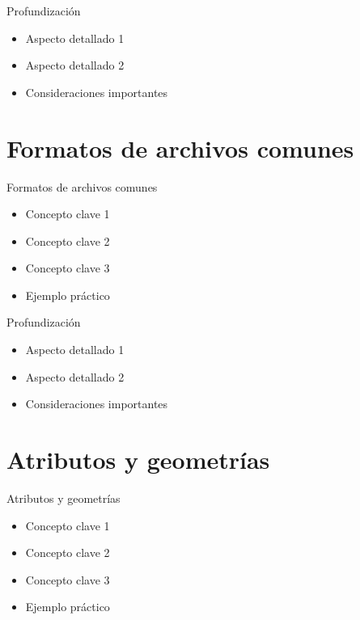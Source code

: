 \documentclass[10pt]{beamer}
\begin{document}
\begin{frame}{Profundización}
    \begin{itemize}
        \item Aspecto detallado 1
        \item Aspecto detallado 2
        \item Consideraciones importantes
    \end{itemize}
\end{frame}

\section{Formatos de archivos comunes}

\begin{frame}{Formatos de archivos comunes}
    \begin{itemize}
        \item Concepto clave 1
        \item Concepto clave 2
        \item Concepto clave 3
        \item Ejemplo práctico
    \end{itemize}
\end{frame}

\begin{frame}{Profundización}
    \begin{itemize}
        \item Aspecto detallado 1
        \item Aspecto detallado 2
        \item Consideraciones importantes
    \end{itemize}
\end{frame}

\section{Atributos y geometrías}

\begin{frame}{Atributos y geometrías}
    \begin{itemize}
        \item Concepto clave 1
        \item Concepto clave 2
        \item Concepto clave 3
        \item Ejemplo práctico
    \end{itemize}
\end{frame}
\end{document}
